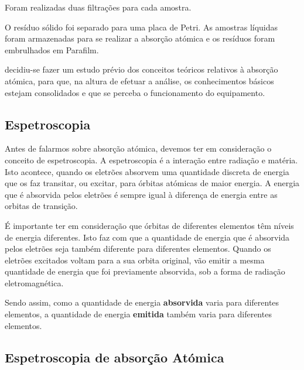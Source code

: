 Foram realizadas duas filtrações para cada amostra.

O resíduo sólido foi separado para uma placa de Petri.
As amostras líquidas foram armazenadas para se realizar a absorção atómica e os resíduos foram embrulhados em Parafilm.

\hrulefill

 decidiu-se fazer um estudo prévio dos conceitos teóricos relativos à absorção atómica, para que, na altura de efetuar a análise, os conhecimentos básicos estejam consolidados e que se perceba o funcionamento do equipamento.

\subsection*{Espetroscopia}\label{subsec:espetroscopia}

Antes de falarmos sobre absorção atómica, devemos ter em consideração o conceito de espetroscopia.
A espetroscopia é a interação entre radiação e matéria.
Isto acontece, quando os eletrões absorvem uma quantidade discreta de energia que os faz transitar, ou excitar, para órbitas atómicas de maior energia.
A energia que é absorvida pelos eletrões é sempre igual à diferença de energia entre as orbitas de transição.

É importante ter em consideração que órbitas de diferentes elementos têm níveis de energia diferentes.
Isto faz com que a quantidade de energia que é absorvida pelos eletrões seja também diferente para diferentes elementos.
Quando os eletrões excitados voltam para a sua orbita original, vão emitir a mesma quantidade de energia que foi previamente absorvida, sob a forma de radiação eletromagnética.

Sendo assim, como a quantidade de energia \textbf{absorvida} varia para diferentes elementos, a quantidade de energia \textbf{emitida} também varia para diferentes elementos.

\subsection*{Espetroscopia de absorção Atómica}\label{subsec:absorcao-atomica}

